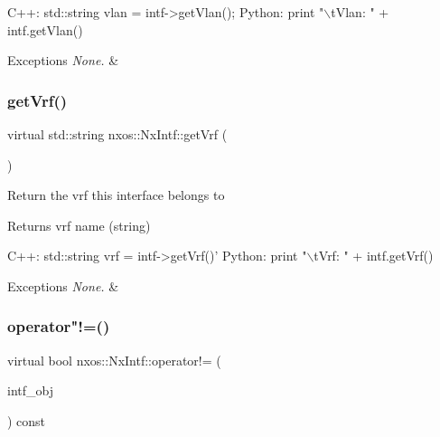 \begin{DoxyCode}
C++:
      std::string vlan = intf->getVlan();
Python:
       print \textcolor{stringliteral}{"\(\backslash\)tVlan: "} + intf.getVlan()
\end{DoxyCode}



\begin{DoxyExceptions}{Exceptions}
{\em None.} & \\
\hline
\end{DoxyExceptions}
\mbox{\label{classnxos_1_1_nx_intf_ae8d21d7a42388aedcda5c7bc3f5c4b04}} 
\subsubsection{\texorpdfstring{get\+Vrf()}{getVrf()}}
{\footnotesize\ttfamily virtual std\+::string nxos\+::\+Nx\+Intf\+::get\+Vrf (\begin{DoxyParamCaption}{ }\end{DoxyParamCaption})\hspace{0.3cm}{\ttfamily [pure virtual]}}

Return the vrf this interface belongs to

\begin{DoxyReturn}{Returns}
vrf name (string)
\end{DoxyReturn}

\begin{DoxyCode}
C++:
       std::string  vrf = intf->getVrf()\textcolor{stringliteral}{'}
\textcolor{stringliteral}{Python:}
\textcolor{stringliteral}{       print "\(\backslash\)tVrf: " + intf.getVrf() }
\end{DoxyCode}



\begin{DoxyExceptions}{Exceptions}
{\em None.} & \\
\hline
\end{DoxyExceptions}
\mbox{\label{classnxos_1_1_nx_intf_aa0b5180978bbdcb3da2f18ed9bef089c}} 
\subsubsection{\texorpdfstring{operator"!=()}{operator!=()}}
{\footnotesize\ttfamily virtual bool nxos\+::\+Nx\+Intf\+::operator!= (\begin{DoxyParamCaption}\item[{\mbox{\hyperlink{classnxos_1_1_nx_intf}{Nx\+Intf}} const \&}]{intf\+\_\+obj }\end{DoxyParamCaption}) const\hspace{0.3cm}{\ttfamily [pure virtual]}}

